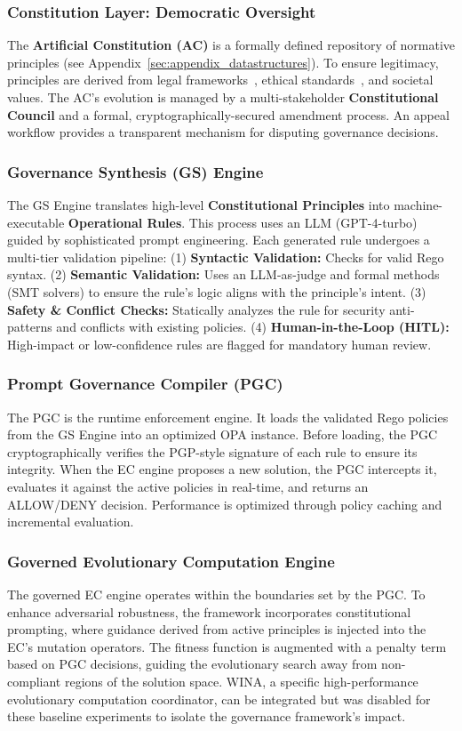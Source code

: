 \documentclass[10pt,twocolumn]{article}
\theoremstyle{definition}
\begin{document}
\subsubsection{Constitution Layer: Democratic Oversight}
The \textbf{Artificial Constitution (AC)} is a formally defined repository of normative principles (see Appendix~\ref{sec:appendix_datastructures}). To ensure legitimacy, principles are derived from legal frameworks~\cite{gdpr2016}, ethical standards~\cite{barocas2019fairness}, and societal values. The AC's evolution is managed by a multi-stakeholder \textbf{Constitutional Council} and a formal, cryptographically-secured amendment process. An appeal workflow provides a transparent mechanism for disputing governance decisions.

\subsubsection{Governance Synthesis (GS) Engine}
The GS Engine translates high-level \textbf{Constitutional Principles} into machine-executable \textbf{Operational Rules}. This process uses an LLM (GPT-4-turbo) guided by sophisticated prompt engineering. Each generated rule undergoes a multi-tier validation pipeline:
(1) \textbf{Syntactic Validation:} Checks for valid Rego syntax.
(2) \textbf{Semantic Validation:} Uses an LLM-as-judge and formal methods (SMT solvers) to ensure the rule's logic aligns with the principle's intent.
(3) \textbf{Safety \& Conflict Checks:} Statically analyzes the rule for security anti-patterns and conflicts with existing policies.
(4) \textbf{Human-in-the-Loop (HITL):} High-impact or low-confidence rules are flagged for mandatory human review.

\subsubsection{Prompt Governance Compiler (PGC)}
The PGC is the runtime enforcement engine. It loads the validated Rego policies from the GS Engine into an optimized OPA instance. Before loading, the PGC cryptographically verifies the PGP-style signature of each rule to ensure its integrity. When the EC engine proposes a new solution, the PGC intercepts it, evaluates it against the active policies in real-time, and returns an ALLOW/DENY decision. Performance is optimized through policy caching and incremental evaluation.

\subsubsection{Governed Evolutionary Computation Engine}
The governed EC engine operates within the boundaries set by the PGC. To enhance adversarial robustness, the framework incorporates constitutional prompting, where guidance derived from active principles is injected into the EC's mutation operators. The fitness function is augmented with a penalty term based on PGC decisions, guiding the evolutionary search away from non-compliant regions of the solution space. WINA, a specific high-performance evolutionary computation coordinator, can be integrated but was disabled for these baseline experiments to isolate the governance framework's impact.
\end{document}
